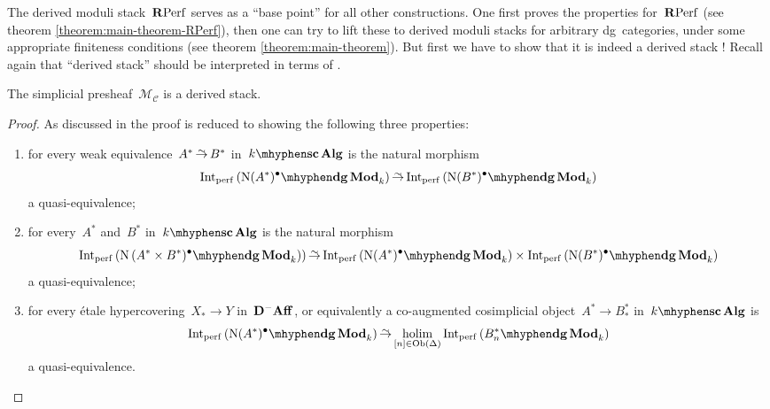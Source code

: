 \begin{refsection}
The derived moduli stack~$\mathbf{R}\mathrm{Perf}$ serves as a ``base point'' for all other constructions. One first proves the properties for~$\mathbf{R}\mathrm{Perf}$ (see theorem \ref{theorem:main-theorem-RPerf}), then one can try to lift these to derived moduli stacks for arbitrary dg~categories, under some appropriate finiteness conditions (see theorem \ref{theorem:main-theorem}). But first we have to show that it is indeed a derived stack \cite[lemma 3.1]{toen-vaquie}! Recall again that ``derived stack'' should be interpreted in terms of \cite[definition 1.3.2.1]{hagII}.

\begin{theorem}
  \label{theorem:derived-moduli-stack-is-stack}
  The simplicial presheaf~$\mathcal{M}_{\mathcal{C}}$ is a derived stack.

  \begin{proof}[Proof]
    As discussed in \cite[\S 2.1.1]{hagII} the proof is reduced to showing the following three properties:
    \begin{enumerate}
      \item for every weak equivalence~$A^*\weq B^*$ in~$\scAlg{k}$ is the natural morphism
        \begin{equation}
          \label{equation:condition-1}
          \Int_\perf\left( \dgMod{\nerve(A^*)^\bullet}_k \right)\weq\Int_\perf\left( \dgMod{\nerve(B^*)^\bullet}_k \right)
        \end{equation}
        a quasi-equivalence;
      \item for every~$A^*$ and~$B^*$ in~$\scAlg{k}$ is the natural morphism
        \begin{equation}
          \Int_\perf\left( \dgMod{\nerve\left( A^*\times B^*)^\bullet}_k \right) \right)\weq\Int_\perf\left( \dgMod{\nerve(A^*)^\bullet}_k \right)\times\Int_\perf\left( \dgMod{\nerve(B^*)^\bullet}_k \right)
        \end{equation}
        a quasi-equivalence;
      \item for every \'etale hypercovering~$X_*\to Y$ in~$\mathbf{D}^-\mathbf{Aff}$, or equivalently a co-augmented cosimplicial object~$A^*\to B_*^*$ in~$\scAlg{k}$ is
        \begin{equation}
          \label{equation:condition-3}
          \Int_\perf\left( \dgMod{\nerve(A^*)^\bullet}_k \right)\weq\holim_{[n]\in\Ob(\Delta)}\Int_\perf\left( \dgMod{B_n^*}_k \right)
        \end{equation}
        a quasi-equivalence.
    \end{enumerate}


\end{proof}
\end{theorem}
\end{refsection}
